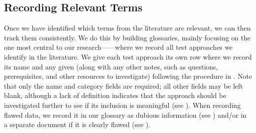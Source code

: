 
\subsection{Recording Relevant Terms}\label{record-terms}

\ifnotpaper
    
\fi

Once we have identified which terms from the literature are relevant, we can
then track them consistently. We do this by building glossaries, mainly
focusing on the one most central to our research---\ourApproachGlossary{}---where
we record all test approaches we identify in the literature. We give each test
approach its own row where we record its name and any given \approachFields{}
(along with any other notes, such as questions, prerequisites, and other
resources to investigate) following the procedure in .
Note that only the name and category fields are required; all other fields
may be left blank, although a lack of definition indicates that the approach
should be investigated further to see if its inclusion is meaningful (see
). When recording flawed data, we record it in our glossary as
dubious information (see )
and/or in a separate document if it is clearly flawed (see ).

